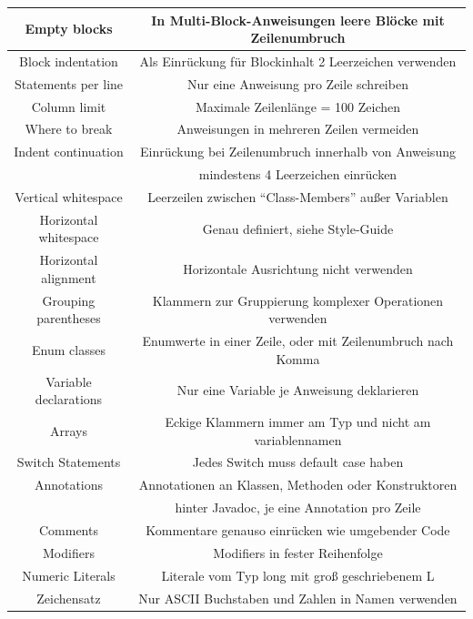 \documentclass[da,ngerman]{stthesis}
\begin{document}
\begin{center}
\begin{longtabu}{|c|c|}
						\hline
						Empty blocks & In Multi-Block-Anweisungen leere Blöcke mit Zeilenumbruch \\
						\hline
						Block indentation & Als Einrückung für Blockinhalt 2 Leerzeichen verwenden \\
						\hline
						Statements per line & Nur eine Anweisung pro Zeile schreiben \\
						\hline
						Column limit & Maximale Zeilenlänge = 100 Zeichen \\
						\hline
						Where to break & Anweisungen in mehreren Zeilen vermeiden \\
						\hline
						Indent continuation & Einrückung bei Zeilenumbruch innerhalb von Anweisung \\ & mindestens 4 Leerzeichen einrücken \\
						\hline
						Vertical whitespace & Leerzeilen zwischen "`Class-Members"' außer Variablen \\
						\hline
						Horizontal whitespace & Genau definiert, siehe Style-Guide  \\
						\hline
						Horizontal alignment & Horizontale Ausrichtung nicht verwenden \\
						\hline
						Grouping parentheses & Klammern zur Gruppierung komplexer Operationen verwenden \\
						\hline
						Enum classes & Enumwerte in einer Zeile, oder mit Zeilenumbruch nach Komma \\
						\hline
						Variable declarations & Nur eine Variable je Anweisung deklarieren \\
						\hline
						Arrays & Eckige Klammern immer am Typ und nicht am variablennamen \\
						\hline
						Switch Statements & Jedes Switch muss default case haben  \\
						\hline
						Annotations & Annotationen an Klassen, Methoden oder Konstruktoren \\ & hinter Javadoc, je eine Annotation pro Zeile \\
						\hline
						Comments & Kommentare genauso einrücken wie umgebender Code \\
						\hline
						Modifiers & Modifiers in fester Reihenfolge \\
						\hline
						Numeric Literals & Literale vom Typ long mit groß geschriebenem L \\
						\hline
						Zeichensatz & Nur ASCII Buchstaben und Zahlen in Namen verwenden \\
						\hline

\end{longtabu}
\end{center}
\end{document}
